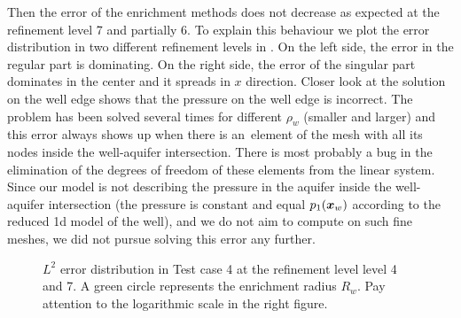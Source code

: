 Then the error of the enrichment methods does not decrease as expected at the refinement level 7 and partially 6. 
To explain this behaviour we plot the error distribution in two different refinement levels in .
On the left side, the error in the regular part is dominating. On the right side, the error of the singular part dominates in the center
and it spreads in $x$ direction. Closer look at the solution on the well edge shows that the pressure on the well edge is incorrect.
The problem has been solved several times for different $\rho_w$ (smaller and larger) and this error always shows up when there is 
an~element of the mesh with all its nodes inside the well-aquifer intersection. There is most probably a bug in the elimination of the
degrees of freedom of these elements from the linear system.
Since our model is not describing the pressure in the aquifer inside the well-aquifer intersection
(the pressure is constant and equal $p_1(\mathbf{\boldsymbol{x}}_w)$ according to the reduced 1d model of the well),
and we do not aim to compute on such fine meshes, we did not pursue solving this error any further.

\begin{figure}[!htb]
  \centering
  \hfill
  \caption[Error distribution in Test case 4]{$L^2$ error distribution in Test case 4 at the refinement level level 4 and 7.
  A green circle represents the enrichment radius $R_w$. Pay attention to the logarithmic scale in the right figure.}
  \label{fig:error_distribution_test4}
\end{figure}
%

